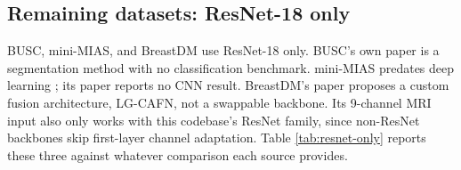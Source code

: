 \documentclass[11pt]{article}
\begin{document}
\subsection{Remaining datasets: ResNet-18 only}

BUSC, mini-MIAS, and BreastDM use ResNet-18 only. BUSC's own paper
\citep{iqbalsharif2023pdfunet} is a segmentation method with no
classification benchmark. mini-MIAS predates deep learning
\citep{suckling1994mias}; its paper reports no CNN result. BreastDM's paper
proposes a custom fusion architecture, LG-CAFN, not a swappable backbone.
Its 9-channel MRI input also only works with this codebase's ResNet family,
since non-ResNet backbones skip first-layer channel adaptation. Table
\ref{tab:resnet-only} reports these three against whatever comparison each
source provides.

\begin{table}[htbp]
  \centering
  \caption{BUSC, mini-MIAS, BreastDM: ResNet-18 only, vs.\ the source literature where a comparable number exists.}
  \label{tab:resnet-only}
\end{table}
\end{document}
